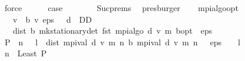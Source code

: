\begin{isabellebody}
\ force\isanewline
\ \ \ \ \isamarkupfalse%
\ {\isacharquery}{\kern0pt}case\isanewline
\ \ \ \ \ \ \isamarkupfalse%
\ Suc{\isachardot}{\kern0pt}prems{\isacharparenleft}{\kern0pt}{}{\isacharparenright}{\kern0pt}\ \isamarkupfalse%
\ presburger\isanewline
\ \ \isamarkupfalse%
\isanewline
{}\isamarkupfalse%
%
\endisatagproof
{\isafoldproof}%
%
\isadelimproof
\isanewline
%
\endisadelimproof
\isanewline
{}\isamarkupfalse%
\ mpi{\isacharunderscore}{\kern0pt}algo{\isacharunderscore}{\kern0pt}opt{\isacharcolon}{\kern0pt}\ \isanewline
\ \ \ {\isachardoublequoteopen}v{}\ {\isasymle}\ {\isasymL}\isactrlsub b\ v{}{\isachardoublequoteclose}\ {\isachardoublequoteopen}eps\ {\isachargreater}{\kern0pt}\ {}{\isachardoublequoteclose}\ {\isachardoublequoteopen}d\ {\isasymin}\ D\isactrlsub D{\isachardoublequoteclose}\isanewline
\ \ \ {\isachardoublequoteopen}dist\ {\isacharparenleft}{\kern0pt}{\isasymnu}\isactrlsub b\ {\isacharparenleft}{\kern0pt}mk{\isacharunderscore}{\kern0pt}stationary{\isacharunderscore}{\kern0pt}det\ {\isacharparenleft}{\kern0pt}fst\ {\isacharparenleft}{\kern0pt}mpi{\isacharunderscore}{\kern0pt}algo\ d\ v{}\ m{\isacharparenright}{\kern0pt}{\isacharparenright}{\kern0pt}{\isacharparenright}{\kern0pt}{\isacharparenright}{\kern0pt}\ {\isasymnu}\isactrlsub b{\isacharunderscore}{\kern0pt}opt\ {\isacharless}{\kern0pt}\ eps{\isachardoublequoteclose}\isanewline
%
\isadelimproof
%
\endisadelimproof
%
\isatagproof
{}\isamarkupfalse%
\ {\isacharminus}{\kern0pt}\isanewline
\ \ \isamarkupfalse%
\ {\isacharquery}{\kern0pt}P\ {\isacharequal}{\kern0pt}\ {\isachardoublequoteopen}{\isasymlambda}n{\isachardot}{\kern0pt}\ {}\ {\isacharasterisk}{\kern0pt}\ l\ {\isacharasterisk}{\kern0pt}\ dist\ {\isacharparenleft}{\kern0pt}mpi{\isacharunderscore}{\kern0pt}val\ d\ v{}\ m\ n{\isacharparenright}{\kern0pt}\ {\isacharparenleft}{\kern0pt}{\isasymL}\isactrlsub b\ {\isacharparenleft}{\kern0pt}mpi{\isacharunderscore}{\kern0pt}val\ d\ v{}\ m\ n{\isacharparenright}{\kern0pt}{\isacharparenright}{\kern0pt}\ {\isacharless}{\kern0pt}\ \ eps\ {\isacharasterisk}{\kern0pt}\ {\isacharparenleft}{\kern0pt}{}\ {\isacharminus}{\kern0pt}\ l{\isacharparenright}{\kern0pt}{\isachardoublequoteclose}\isanewline
\ \ \isamarkupfalse%
\ {\isacharquery}{\kern0pt}n\ {\isacharequal}{\kern0pt}\ {\isachardoublequoteopen}Least\ {\isacharquery}{\kern0pt}P{\isachardoublequoteclose}\isanewline

\end{isabellebody}
